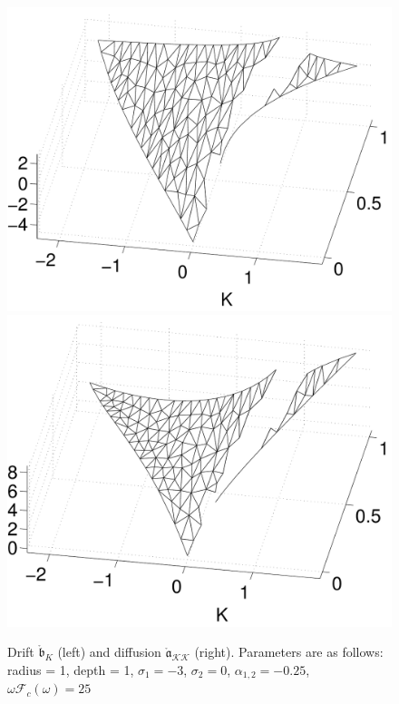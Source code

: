 \begin{figure}
\begin{center}
\includegraphics[width=\textwidth*7/16]{figures/b1_db4_mesh}
\includegraphics[width=\textwidth*7/16]{figures/a11_db4_mesh}
\caption{Drift $\mathring{\mathfrak b}_K$ (left) and diffusion $\mathring{\mathfrak a}_{\mathcal K \mathcal K}$ (right). Parameters are as follows: radius = 1, depth = 1, $\sigma_1 = -3$, $\sigma_2 = 0$, $\alpha_{1,2} = -0.25$, $\omega \mathcal{F}_c(\omega) = 25$}
\label{f:drift diffusion figures}
\end{center}
\end{figure}

